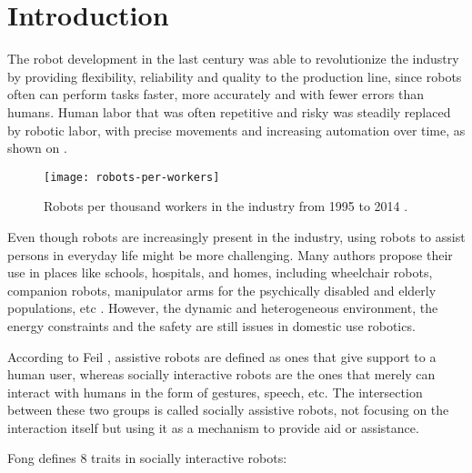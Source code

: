 \chapter{Introduction}\label{chp:intro}

The robot development in the last century was able to revolutionize the industry by providing flexibility, reliability and quality to the production line, since robots often can perform tasks faster, more accurately and with fewer errors than humans. Human labor that was often repetitive and risky was steadily replaced by robotic labor, with precise movements and increasing automation over time, as shown on .

\begin{figure}[!ht]
    \centering
    \texttt{[image: robots-per-workers]}
    \caption{Robots per thousand workers in the industry from 1995 to 2014 \cite{dauth2017german}.}
    \label{fig:robots-per-workers}
\end{figure}

Even though robots are increasingly present in the industry, using robots to assist persons in everyday life might be more challenging. Many authors propose their use in places like schools, hospitals, and homes, including wheelchair robots, companion robots, manipulator arms for the psychically disabled and elderly populations, etc \cite{feil2005defining}. However, the dynamic and heterogeneous environment, the energy constraints and the safety are still issues in domestic use robotics.

According to Feil \cite{feil2005defining}, assistive robots are defined as ones that give support to a human user, whereas socially interactive robots are the ones that merely can interact with humans in the form of gestures, speech, etc. The intersection between these two groups is called socially assistive robots, not focusing on the interaction itself but using it as a mechanism to provide aid or assistance.

Fong \cite{fong2003survey} defines 8 traits in socially interactive robots:

